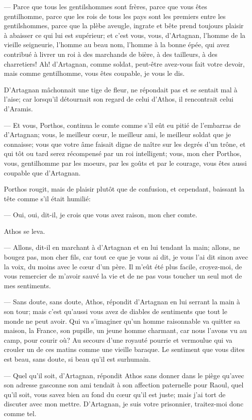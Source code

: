 — Parce que tous les gentilshommes sont frères, parce que vous êtes gentilhomme, parce que les rois de tous les pays sont les premiers entre les gentilshommes, parce que la plèbe aveugle, ingrate et bête prend toujours plaisir à abaisser ce qui lui est supérieur; et c'est vous, vous, d'Artagnan, l'homme de la vieille seigneurie, l'homme au beau nom, l'homme à la bonne épée, qui avez contribué à livrer un roi à des marchands de bière, à des tailleurs, à des charretiers! Ah! d'Artagnan, comme soldat, peut-être avez-vous fait votre devoir, mais comme gentilhomme, vous êtes coupable, je vous le dis.

D'Artagnan mâchonnait une tige de fleur, ne répondait pas et se sentait mal à l'aise; car lorsqu'il détournait son regard de celui d'Athos, il rencontrait celui d'Aramis.

— Et vous, Porthos, continua le comte comme s'il eût eu pitié de l'embarras de d'Artagnan; vous, le meilleur cœur, le meilleur ami, le meilleur soldat que je connaisse; vous que votre âme faisait digne de naître sur les degrés d'un trône, et qui tôt ou tard serez récompensé par un roi intelligent; vous, mon cher Porthos, vous, gentilhomme par les moeurs, par les goûts et par le courage, vous êtes aussi coupable que d'Artagnan.

Porthos rougit, mais de plaisir plutôt que de confusion, et cependant, baissant la tête comme s'il était humilié:

— Oui, oui, dit-il, je crois que vous avez raison, mon cher comte.

Athos se leva.

— Allons, dit-il en marchant à d'Artagnan et en lui tendant la main; allons, ne bougez pas, mon cher fils, car tout ce que je vous ai dit, je vous l'ai dit sinon avec la voix, du moins avec le cœur d'un père. Il m'eût été plus facile, croyez-moi, de vous remercier de m'avoir sauvé la vie et de ne pas vous toucher un seul mot de mes sentiments.

— Sans doute, sans doute, Athos, répondit d'Artagnan en lui serrant la main à son tour; mais c'est qu'aussi vous avez de diables de sentiments que tout le monde ne peut avoir. Qui va s'imaginer qu'un homme raisonnable va quitter sa maison, la France, son pupille, un jeune homme charmant, car nous l'avons vu au camp, pour courir où? Au secours d'une royauté pourrie et vermoulue qui va crouler un de ces matins comme une vieille baraque. Le sentiment que vous dites est beau, sans doute, si beau qu'il est surhumain.

— Quel qu'il soit, d'Artagnan, répondit Athos sans donner dans le piège qu'avec son adresse gasconne son ami tendait à son affection paternelle pour Raoul, quel qu'il soit, vous savez bien au fond du cœur qu'il est juste; mais j'ai tort de discuter avec mon mettre. D'Artagnan, je suis votre prisonnier, traitez-moi donc comme tel.

